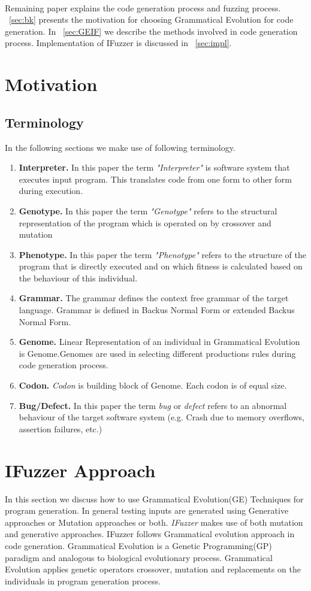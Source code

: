 \documentclass{sig-alternate}
\begin{document}
\\Remaining paper explains the code generation process and fuzzing process. ~\autoref{sec:bk} presents the motivation for choosing Grammatical Evolution for code generation. In ~\autoref{sec:GEIF} we describe the methods involved in code generation process. Implementation of IFuzzer is discussed in ~\autoref{sec:impl}.
\section{Motivation} \label{sec:bk}

\subsection{Terminology}
\indent In the following sections we make use of following terminology.
\begin{enumerate}
\item{\textbf{Interpreter.}} In this paper the term \textit{"Interpreter"} is software system that executes input program. This translates code from one form to other form during execution. 
\item{\textbf{Genotype.}} In this paper the term \textit{"Genotype"} refers to the structural representation of the program which is operated on by crossover and mutation
\item{\textbf{Phenotype.}} In this paper the term \textit{"Phenotype"} refers to the structure of the program that is  directly executed and on which fitness is calculated based on the behaviour of this individual.
\item{\textbf{Grammar.}} The grammar defines the context free grammar of the target language. Grammar is defined in Backus Normal Form or extended Backus Normal Form.
\item{\textbf{Genome.}} Linear Representation of an individual in Grammatical Evolution is Genome.Genomes are used in selecting different productions rules during code generation process.
\item{\textbf{Codon.}} \textit{Codon} is building block of Genome. Each codon is of equal size. 
\item{\textbf{Bug/Defect.}} In this paper the term \textit{bug} or \textit{defect} refers to an abnormal behaviour of the target software system (e.g. Crash due to memory overflows, assertion failures, etc.) 
\end{enumerate}

\section{IFuzzer Approach} \label{sec:GEIF}
\indent In this section we discuss how to use Grammatical Evolution(GE) Techniques for program generation. In general testing inputs are generated using Generative approaches or Mutation approaches or both. \textit{IFuzzer} makes use of both mutation and generative approaches. IFuzzer follows Grammatical evolution approach in code generation. Grammatical Evolution is a Genetic Programming(GP) paradigm and analogous to biological evolutionary process. Grammatical Evolution applies genetic operators crossover, mutation and replacements on the individuals in program generation process. 
\end{document}

